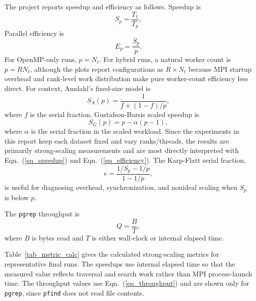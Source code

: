 \documentclass[twocolumn,10pt]{asme2e}
\begin{document}
The project reports speedup and efficiency as follows. Speedup is
\begin{equation}
S_p = \frac{T_1}{T_p},
\label{eq_speedup}
\end{equation}
Parallel efficiency is
\begin{equation}
E_p = \frac{S_p}{p}.
\label{eq_efficiency}
\end{equation}
For OpenMP-only runs, $p=N_t$. For hybrid runs, a natural worker count is $p=R N_t$, although the plots report configurations as $R \times N_t$ because MPI startup overhead and rank-level work distribution make pure worker-count efficiency less direct. For context, Amdahl's fixed-size model is
\begin{equation}
S_A(p)=\frac{1}{f+(1-f)/p},
\label{eq_amdahl}
\end{equation}
where $f$ is the serial fraction. Gustafson-Barsis scaled speedup is
\begin{equation}
S_G(p)=p-\alpha(p-1),
\label{eq_gustafson}
\end{equation}
where $\alpha$ is the serial fraction in the scaled workload. Since the experiments in this report keep each dataset fixed and vary ranks/threads, the results are primarily strong-scaling measurements and are most directly interpreted with Eqn.~(\ref{eq_speedup}) and Eqn.~(\ref{eq_efficiency}). The Karp-Flatt serial fraction,
\begin{equation}
e=\frac{1/S_p-1/p}{1-1/p},
\label{eq_karpflatt}
\end{equation}
is useful for diagnosing overhead, synchronization, and nonideal scaling when $S_p$ is below $p$.

The \texttt{pgrep} throughput is
\begin{equation}
Q = \frac{B}{T},
\label{eq_throughput}
\end{equation}
where $B$ is bytes read and $T$ is either wall-clock or internal elapsed time.

Table~\ref{tab_metric_calc} gives the calculated strong-scaling metrics for representative final runs. The speedups use internal elapsed time so that the measured value reflects traversal and search work rather than MPI process-launch time. The throughput values use Eqn.~(\ref{eq_throughput}) and are shown only for \texttt{pgrep}, since \texttt{pfind} does not read file contents.
\end{document}
